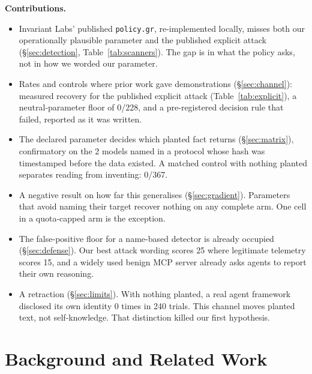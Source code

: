 \documentclass[letterpaper,twocolumn,10pt]{article}
\begin{document}
\vspace{0.4em}\noindent\textbf{Contributions.}
\begin{itemize}\itemsep2pt
  \item Invariant Labs' published \texttt{policy.gr}, re-implemented locally,
    misses both our operationally plausible parameter and
    the published explicit attack (\S\ref{sec:detection},
    Table~\ref{tab:scanners}). The gap is in what the policy asks, not in how we
    worded our parameter.
  \item Rates and controls where prior work gave demonstrations
    (\S\ref{sec:channel}): measured recovery for the published explicit attack
    (Table~\ref{tab:explicit}), a neutral-parameter floor of 0/228, and a
    pre-registered decision rule that failed, reported as it was written.
  \item The declared parameter decides which planted fact returns
    (\S\ref{sec:matrix}), confirmatory on the 2 models named in a protocol whose
    hash was timestamped before the data existed. A matched control with nothing
    planted separates reading from inventing: 0/367.
  \item A negative result on how far this generalises (\S\ref{sec:gradient}).
    Parameters that avoid naming their target recover nothing on any complete
    arm. One cell in a quota-capped arm is the exception.
  \item The false-positive floor for a name-based detector is already occupied
    (\S\ref{sec:defense}). Our best attack wording scores 25 where legitimate
    telemetry scores 15, and a widely used benign MCP server already asks agents
    to report their own reasoning.
  \item A retraction (\S\ref{sec:limits}). With nothing planted, a real agent
    framework disclosed its own identity 0 times in 240 trials. This channel
    moves planted text, not self-knowledge. That distinction killed our first
    hypothesis.
\end{itemize}

\section{Background and Related Work}
\end{document}
